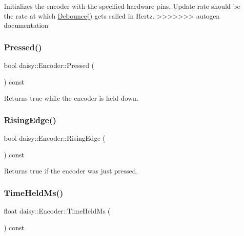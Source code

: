 Initializes the encoder with the specified hardware pins. Update rate should be the rate at which \hyperlink{classdaisy_1_1_encoder_af07f408ac0225fbf124cce607ca4fb6b}{Debounce()} gets called in Hertz. \mbox{\label{classdaisy_1_1_encoder_a7c3a633c4e578dac0bdf5829b9bed99f}} 
>>>>>>> autogen documentation
\subsubsection{\texorpdfstring{Pressed()}{Pressed()}}
{\footnotesize\ttfamily bool daisy\+::\+Encoder\+::\+Pressed (\begin{DoxyParamCaption}{ }\end{DoxyParamCaption}) const\hspace{0.3cm}{\ttfamily [inline]}}

Returns true while the encoder is held down. \mbox{\label{classdaisy_1_1_encoder_ab501cf73d10d81058b485c48b9eb506f}} 
\subsubsection{\texorpdfstring{Rising\+Edge()}{RisingEdge()}}
{\footnotesize\ttfamily bool daisy\+::\+Encoder\+::\+Rising\+Edge (\begin{DoxyParamCaption}{ }\end{DoxyParamCaption}) const\hspace{0.3cm}{\ttfamily [inline]}}

Returns true if the encoder was just pressed. \mbox{\label{classdaisy_1_1_encoder_a5f2e112fa7ab67140344af05f83172ab}} 
\subsubsection{\texorpdfstring{Time\+Held\+Ms()}{TimeHeldMs()}}
{\footnotesize\ttfamily float daisy\+::\+Encoder\+::\+Time\+Held\+Ms (\begin{DoxyParamCaption}{ }\end{DoxyParamCaption}) const\hspace{0.3cm}{\ttfamily [inline]}}

